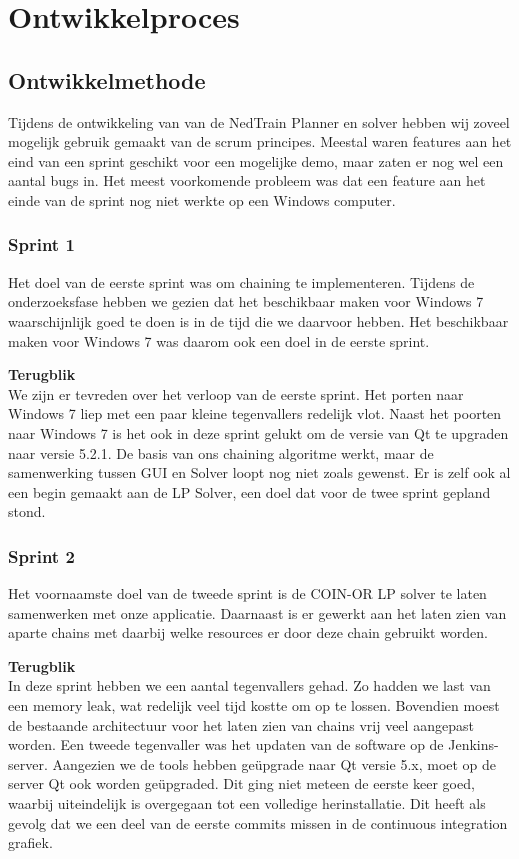 \section{Ontwikkelproces}
\subsection{Ontwikkelmethode}
Tijdens de ontwikkeling van van de NedTrain Planner en solver hebben wij zoveel mogelijk gebruik gemaakt van de scrum principes. Meestal waren features aan het eind van een sprint geschikt voor een mogelijke demo, maar zaten er nog wel een aantal bugs in. Het meest voorkomende probleem was dat een feature aan het einde van de sprint nog niet werkte op een Windows computer.

\subsubsection{Sprint 1}
Het doel van de eerste sprint was om chaining te implementeren. Tijdens de onderzoeksfase hebben we gezien dat het beschikbaar maken voor Windows 7 waarschijnlijk goed te doen is in de tijd die we daarvoor hebben. Het beschikbaar maken voor Windows 7 was daarom ook een doel in de eerste sprint. 

\textbf{Terugblik} \\
We zijn er tevreden over het verloop van de eerste sprint. Het porten naar Windows 7 liep met een paar kleine tegenvallers redelijk vlot. Naast het poorten naar Windows 7 is het ook in deze sprint gelukt om de versie van Qt te upgraden naar versie 5.2.1. De basis van ons chaining algoritme werkt, maar de samenwerking tussen GUI en Solver loopt nog niet zoals gewenst. Er is zelf ook al een begin gemaakt aan de LP Solver, een doel dat voor de twee sprint gepland stond. 

\subsubsection{Sprint 2}
Het voornaamste doel van de tweede sprint is de COIN-OR LP solver te laten samenwerken met onze applicatie. Daarnaast is er gewerkt aan het laten zien van aparte chains met daarbij welke resources er door deze chain gebruikt worden. 

\textbf{Terugblik} \\
In deze sprint hebben we een aantal tegenvallers gehad. Zo hadden we last van een memory leak, wat redelijk veel tijd kostte om op te lossen. Bovendien moest de bestaande architectuur voor het laten zien van chains vrij veel aangepast worden. Een tweede tegenvaller was het updaten van de software op de Jenkins-server. Aangezien we de tools hebben ge\"upgrade naar Qt versie 5.x, moet op de server Qt ook worden ge\"upgraded. Dit ging niet meteen de eerste keer goed, waarbij uiteindelijk is overgegaan tot een volledige herinstallatie. Dit heeft als gevolg dat we een deel van de eerste commits missen in de continuous integration grafiek.


